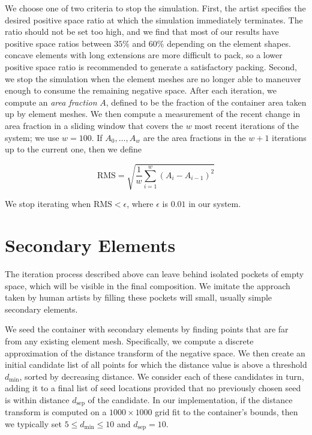 We choose one of two criteria to stop the simulation. First, the artist specifies 
the desired positive space ratio at which the simulation immediately terminates.
The ratio should not be set too high, and
we find that most of our results have positive space ratios between $35\%$ and $60\%$ depending on the element shapes.
concave elements with long extensions are more difficult to pack, 
so a lower positive space ratio is recommended to generate a satisfactory packing.
Second, we stop the simulation when the element meshes are no longer
able to maneuver enough to consume the remaining negative space. 
After each iteration, we compute an \textit{area fraction} $A$, defined to be the fraction of
the container area taken up by element meshes.  We then compute a measurement
of the recent change in area fraction in a sliding window that covers the $w$
most recent iterations of the system; we use $w=100$.  If $A_0,\ldots,A_w$
are the area fractions in the $w+1$ iterations up to the current one, then we
define

\begin{equation}
\mathrm{RMS} = \sqrt{ \frac{1}{w}\sum_{ i = 1 }^{w} { (A_i - A_{i-1}) }^2}
\end{equation}

We stop iterating when $\mathrm{RMS} < \epsilon$, where $\epsilon$ is $0.01$
in our system.

\section{Secondary Elements}
\label{repulsionpak_secondary_elements}

The iteration process described above can leave behind isolated pockets of 
empty space, which will be visible in the final composition.  We imitate the
approach taken by human artists by filling these pockets will small, usually
simple secondary elements.  

We seed the container with secondary elements by finding points
that are far from any existing element mesh.  Specifically, we
compute a discrete approximation of the distance transform of the
negative space. We then create an initial candidate list of all
points for which the distance value is above a threshold $d_\mathrm{min}$, 
sorted by decreasing distance.  We consider each of these candidates in turn,
adding it to a final list of seed locations provided that no previously
chosen seed is within distance $d_\mathrm{sep}$ of the candidate.
In our implementation, if the distance transform is computed on a 
$1000\times 1000$ grid fit to the container's bounds, then we typically 
set $5 \leq d_\mathrm{min} \leq 10$ and $d_\mathrm{sep}=10$. 


